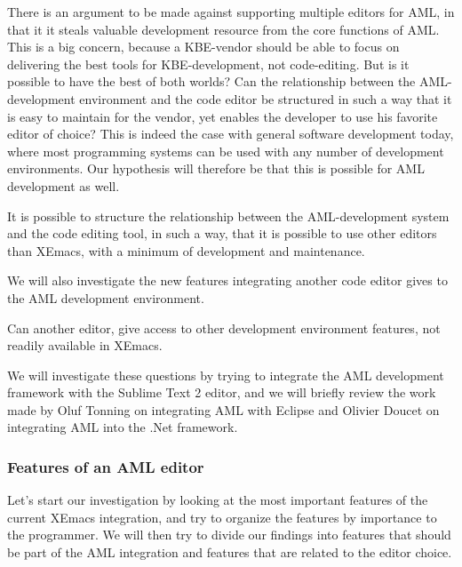 There is an argument to be made against supporting multiple editors for AML, in that it it steals valuable development resource from the core functions of AML. This is a big concern, because a KBE-vendor should be able to focus on delivering the best tools for KBE-development, not code-editing. But is it possible to have the best of both worlds? Can the relationship between the AML-development environment and the code editor be structured in such a way that it is easy to maintain for the vendor, yet enables the developer to use his favorite editor of choice? This is indeed the case with general software development today, where most programming systems can be used with any number of development environments. Our hypothesis will therefore be that this is possible for AML development as well.

\begin{myrq}
\label{rq:structure_aml}
    It is possible to structure the relationship between the AML-development system and the code editing tool, in such a way, that it is possible to use other editors than XEmacs, with a minimum of development and maintenance.
\end{myrq}

We will also investigate the new features integrating another code editor gives to the AML development environment.

\begin{myrq}
\label{rq:another_editor}
    Can another editor, give access to other development environment features, not readily available in XEmacs.
\end{myrq}

We will investigate these questions by trying to integrate the AML development framework with the Sublime Text 2 editor, and we will briefly review the work made by Oluf Tonning \cite{oluf} on integrating AML with Eclipse and Olivier Doucet \cite{olivier} on integrating AML into the .Net framework.

\subsubsection{Features of an AML editor} %
\label{ssub:features_of_an_aml_editor}
Let's start our investigation by looking at the most important features of the current XEmacs integration, and try to organize the features by importance to the programmer. We will then try to divide our findings into features that should be part of the AML integration and features that are related to the editor choice.



